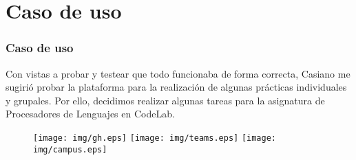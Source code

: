 \documentclass{beamer}
\begin{document}
\section{Caso de uso}

\begin{frame}[allowframebreaks]
\frametitle{Caso de uso}

  Con vistas a probar y testear que todo funcionaba de forma correcta, Casiano me sugirió probar 
  la plataforma para la realización de algunas prácticas individuales y grupales. Por ello, decidimos 
  realizar algunas tareas para la asignatura de Procesadores de Lenguajes en CodeLab.

  \framebreak

  \begin{figure}[!htb]
      \texttt{[image: img/gh.eps]}
    \endminipage\hfill
      \texttt{[image: img/teams.eps]}
    \endminipage\hfill
      \texttt{[image: img/campus.eps]}
    \endminipage
  \end{figure}

\end{frame}

\end{document}
